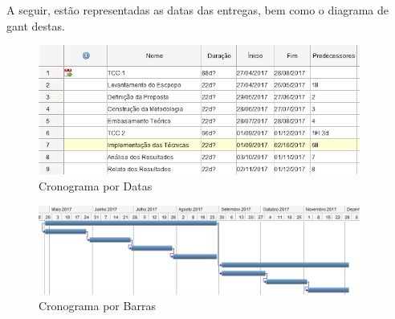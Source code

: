 A seguir, estão representadas as datas das entregas, bem como o diagrama
de gant destas.

\begin{figure}[h]
    \centering
    \includegraphics[width=400px, scale=1]{figuras/cronogramadatas}
    \caption{Cronograma por Datas}
    \label{fig:cronogramadatas}
\end{figure}

\begin{figure}[h]
    \centering
    \includegraphics[width=400px, scale=1]{figuras/cronogramabarras}
    \caption{Cronograma por Barras}
    \label{fig:cronogramabarras}
\end{figure}
